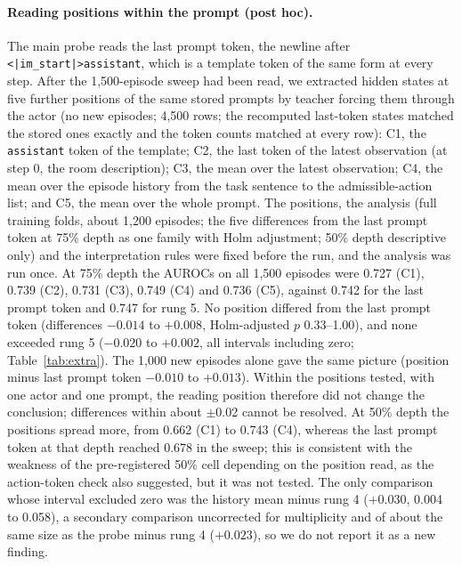 \documentclass[11pt]{article}
\begin{document}
\paragraph{Reading positions within the prompt (post hoc).} The main probe reads the last prompt token, the newline after \texttt{<|im\_start|>assistant}, which is a template token of the same form at every step. After the 1,500-episode sweep had been read, we extracted hidden states at five further positions of the same stored prompts by teacher forcing them through the actor (no new episodes; 4,500 rows; the recomputed last-token states matched the stored ones exactly and the token counts matched at every row): C1, the \texttt{assistant} token of the template; C2, the last token of the latest observation (at step 0, the room description); C3, the mean over the latest observation; C4, the mean over the episode history from the task sentence to the admissible-action list; and C5, the mean over the whole prompt. The positions, the analysis (full training folds, about 1,200 episodes; the five differences from the last prompt token at 75\% depth as one family with Holm adjustment; 50\% depth descriptive only) and the interpretation rules were fixed before the run, and the analysis was run once. At 75\% depth the AUROCs on all 1,500 episodes were 0.727 (C1), 0.739 (C2), 0.731 (C3), 0.749 (C4) and 0.736 (C5), against 0.742 for the last prompt token and 0.747 for rung 5. No position differed from the last prompt token (differences $-0.014$ to $+0.008$, Holm-adjusted $p$ 0.33--1.00), and none exceeded rung 5 ($-0.020$ to $+0.002$, all intervals including zero; Table~\ref{tab:extra}). The 1,000 new episodes alone gave the same picture (position minus last prompt token $-0.010$ to $+0.013$). Within the positions tested, with one actor and one prompt, the reading position therefore did not change the conclusion; differences within about $\pm$0.02 cannot be resolved. At 50\% depth the positions spread more, from 0.662 (C1) to 0.743 (C4), whereas the last prompt token at that depth reached 0.678 in the sweep; this is consistent with the weakness of the pre-registered 50\% cell depending on the position read, as the action-token check also suggested, but it was not tested. The only comparison whose interval excluded zero was the history mean minus rung 4 ($+0.030$, 0.004 to 0.058), a secondary comparison uncorrected for multiplicity and of about the same size as the probe minus rung 4 ($+0.023$), so we do not report it as a new finding.
\end{document}
